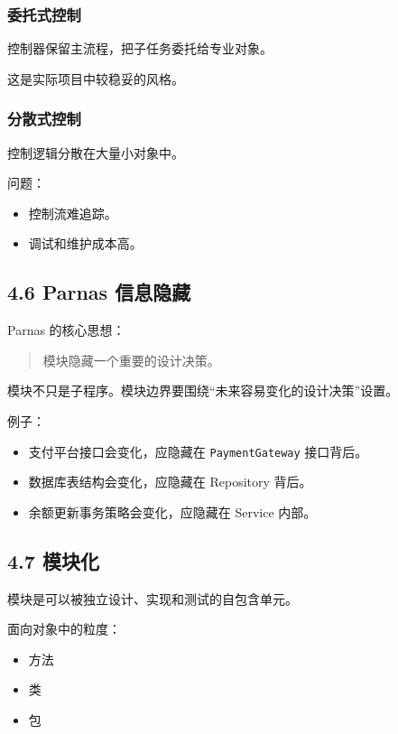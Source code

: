 \documentclass[UTF8,zihao=-4]{ctexart}
\begin{document}
\subsubsection{委托式控制}

控制器保留主流程，把子任务委托给专业对象。

这是实际项目中较稳妥的风格。

\subsubsection{分散式控制}

控制逻辑分散在大量小对象中。

问题：

\begin{itemize}
\item 控制流难追踪。
\item 调试和维护成本高。
\end{itemize}

\subsection{4.6 Parnas 信息隐藏}

Parnas 的核心思想：

\begin{quote}
模块隐藏一个重要的设计决策。
\end{quote}

模块不只是子程序。模块边界要围绕“未来容易变化的设计决策”设置。

例子：

\begin{itemize}
\item 支付平台接口会变化，应隐藏在 \texttt{PaymentGateway} 接口背后。
\item 数据库表结构会变化，应隐藏在 Repository 背后。
\item 余额更新事务策略会变化，应隐藏在 Service 内部。
\end{itemize}

\subsection{4.7 模块化}

模块是可以被独立设计、实现和测试的自包含单元。

面向对象中的粒度：

\begin{itemize}
\item 方法
\item 类
\item 包
\end{itemize}
\end{document}
